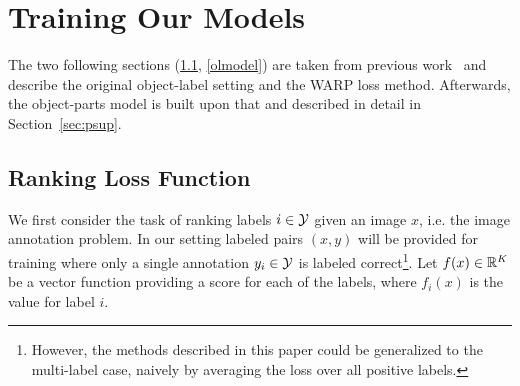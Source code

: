 








\section{Training Our Models} \label{sec:training}

The two following sections (\ref{warp}, \ref{olmodel}) are taken from
previous work~\cite{image-wsabie} and describe the original object-label
setting and the WARP loss method. Afterwards, the object-parts model is built
upon that and described in detail in Section~\ref{sec:psup}. 

\subsection{Ranking Loss Function} \label{warp}
\newcommand{\ybar}{{\bar{y}}}
\newcommand{\Ybar}{n}
\newcommand{\newL}{\tilde{L}}
\newcommand{\newPhi}{\tilde{\Phi}}
\newcommand{\proba}{\text{Pr}}
We first consider the task of ranking labels $i \in {\cal Y}$ given  an image $x$,
i.e. the image annotation problem.
In our setting labeled pairs $(x,y)$ will be provided for training where
only a single annotation $y_i \in {\cal Y}$ is labeled correct\footnote{However, the methods described in this paper could be generalized to the multi-label case, naively by averaging the loss over all positive labels.}.
Let $f(x) \in \mathbb{R}^K$ be a vector function  providing a
score for each of the labels, where $f_i(x)$ is
the value for label $i$.

